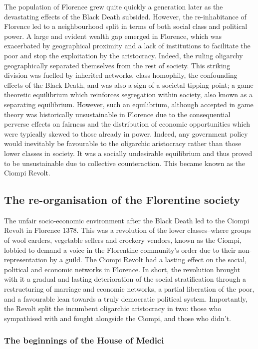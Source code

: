 The population of Florence grew quite quickly a generation later as the devastating effects of the Black Death subsided. However, the re-inhabitance of Florence led to a neighbourhood split in terms of both social class and political power. A large and evident wealth gap emerged in Florence, which was exacerbated by geographical proximity and a lack of institutions to facilitate the poor and stop the exploitation by the aristocracy. Indeed, the ruling oligarchy geographically separated themselves from the rest of society. This striking division was fuelled by inherited networks, class homophily, the confounding effects of the Black Death, and was also a sign of a societal tipping-point; a game theoretic equilibrium which reinforces segregation within society, also known as a separating equilibrium. However, such an equilibrium, although accepted in game theory was historically unsustainable in Florence due to the consequential perverse effects on fairness and the distribution of economic opportunities which were typically skewed to those already in power. Indeed, any government policy would inevitably be favourable to the oligarchic aristocracy rather than those lower classes in society. It was a socially undesirable equilibrium and thus proved to be unsustainable due to collective counteraction. This became known as the Ciompi Revolt.

\subsection{The re-organisation of the Florentine society}

The unfair socio-economic environment after the Black Death led to the Ciompi Revolt in Florence 1378. This was a revolution of the lower classes--where groups of wool carders, vegetable sellers and crockery vendors, known as the Ciompi, lobbied to demand a voice in the Florentine community's order due to their non-representation by a guild. The Ciompi Revolt had a lasting effect on the social, political and economic networks in Florence. In short, the revolution brought with it a gradual and lasting deterioration of the social stratification through a restructuring of marriage and economic networks, a partial liberation of the poor, and a favourable lean towards a truly democratic political system. Importantly, the Revolt split the incumbent oligarchic aristocracy in two: those who sympathised with and fought alongside the Ciompi, and those who didn't.

\subsubsection{The beginnings of the House of Medici}

